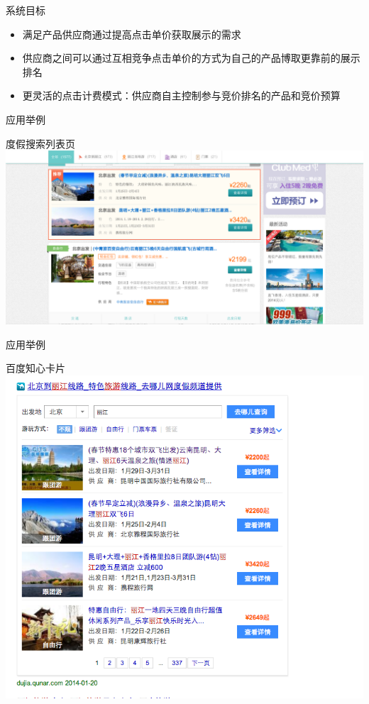 \documentclass{beamer}
\begin{document}
\begin{CJK}{UTF8}{gbsn}
\begin{frame}{系统目标}
  \begin{itemize}
  \item {
    满足产品供应商通过提高点击单价获取展示的需求
  }
  \item {
    供应商之间可以通过互相竞争点击单价的方式为自己的产品博取更靠前的展示排名
  }
  \item {
    更灵活的点击计费模式：供应商自主控制参与竞价排名的产品和竞价预算
  }
  \end{itemize}
\end{frame}

\begin{frame}{应用举例}
  \begin{block}{度假搜索列表页}
    \includegraphics[scale=0.22]{./imgs/overview-qunar}
  \end{block}
\end{frame}

\begin{frame}{应用举例}
  \begin{block}{百度知心卡片}
    \includegraphics[scale=0.3]{./imgs/overview-baidu}
  \end{block}
\end{frame}


\end{CJK}
\end{document}
